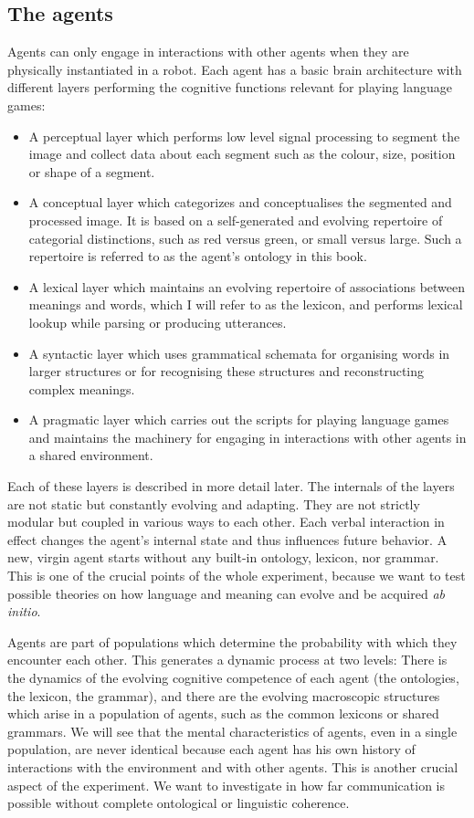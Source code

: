\subsection{The agents}

Agents can only engage in interactions with other agents 
when they are physically instantiated
in a robot. Each agent has a basic brain architecture
with different layers performing the cognitive functions 
relevant for playing language games: 
\begin{itemize}
\item A perceptual layer which performs low level signal 
processing to segment the image and collect data about 
each segment such as the colour, size, position or shape
of a segment. 
\item A conceptual layer which categorizes and 
conceptualises the segmented and processed image. 
It is based on a self-generated and evolving repertoire
of categorial distinctions, such as red versus green, or
small versus large. Such a repertoire is referred to as 
the agent's ontology in this book. 
\item A lexical layer which maintains an evolving repertoire
of associations between meanings and words, which I will refer to 
as the lexicon, and performs lexical lookup while parsing 
or producing utterances. 
\item A syntactic layer which uses 
grammatical schemata for organising words
in larger structures or for recognising these structures and
reconstructing complex meanings. 
\item A pragmatic layer which carries out the
scripts for playing language games and maintains the machinery 
for engaging in interactions with other agents in a 
shared environment. 
\end{itemize}
Each of these layers is described in more detail 
later. The internals of the layers are not static but
constantly evolving and adapting. They are not strictly 
modular but coupled in various ways to each other.
Each verbal interaction 
in effect changes the agent's internal state and thus 
influences future behavior. A new, virgin agent 
starts without any built-in ontology, lexicon, nor grammar. 
This is one of the crucial points of the whole experiment, 
because we want to test possible theories on how language
and meaning can evolve and be acquired {\it ab initio}. 

Agents are part of populations which determine the probability
with which they encounter each other. This generates 
a dynamic process at two levels: There is the dynamics of the evolving
cognitive competence of each agent (the ontologies, 
the lexicon, the grammar), and there are 
the evolving macroscopic structures which arise in a population
of agents, such as the common lexicons or shared grammars. 
We will see that the mental 
characteristics of agents, even in a single population, are never 
identical because each agent has his own history of 
interactions with the environment and with other agents. 
This is another crucial aspect of the experiment. 
We want to investigate in how far communication is possible
without complete ontological or linguistic coherence. 

